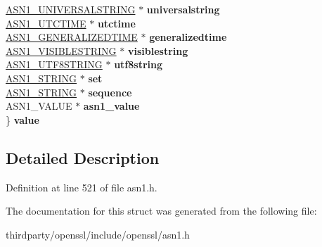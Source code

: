 \begin{DoxyCompactItemize}
\begin{tabbing}
\>\hyperlink{structasn1__string__st}{ASN1\_UNIVERSALSTRING} $\ast$ {\bfseries universalstring}\\
\>\hyperlink{structasn1__string__st}{ASN1\_UTCTIME} $\ast$ {\bfseries utctime}\\
\>\hyperlink{structasn1__string__st}{ASN1\_GENERALIZEDTIME} $\ast$ {\bfseries generalizedtime}\\
\>\hyperlink{structasn1__string__st}{ASN1\_VISIBLESTRING} $\ast$ {\bfseries visiblestring}\\
\>\hyperlink{structasn1__string__st}{ASN1\_UTF8STRING} $\ast$ {\bfseries utf8string}\\
\>\hyperlink{structasn1__string__st}{ASN1\_STRING} $\ast$ {\bfseries set}\\
\>\hyperlink{structasn1__string__st}{ASN1\_STRING} $\ast$ {\bfseries sequence}\\
\>ASN1\_VALUE $\ast$ {\bfseries asn1\_value}\\
\} {\bfseries value}\\

\end{tabbing}\end{DoxyCompactItemize}


\subsection{Detailed Description}


Definition at line 521 of file asn1.\+h.



The documentation for this struct was generated from the following file\+:\begin{DoxyCompactItemize}
\item 
thirdparty/openssl/include/openssl/asn1.\+h\end{DoxyCompactItemize}
